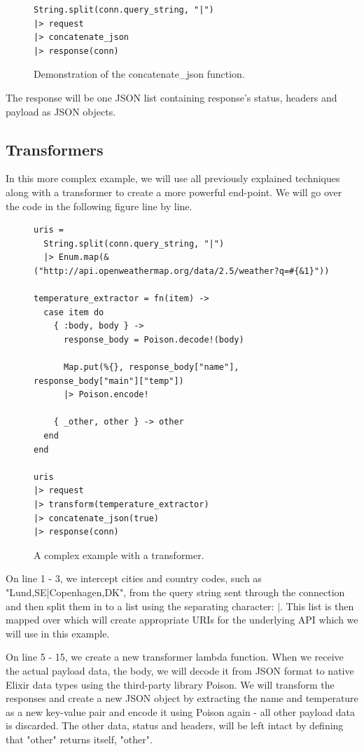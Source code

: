 \documentclass{cslthse-msc}
\begin{document}
\begin{figure}[H]
  \centering
\begin{lstlisting}[breaklines=true,frame=single]
String.split(conn.query_string, "|")
|> request
|> concatenate_json
|> response(conn)
\end{lstlisting}
  \caption{Demonstration of the concatenate\_json function.}
\end{figure}

The response will be one JSON list containing response's status, headers and payload as JSON objects.

\subsection{Transformers}
In this more complex example, we will use all previously explained techniques along with a transformer to create a more powerful end-point. We will go over the code in the following figure line by line.

\begin{figure}[H]
  \centering
\begin{lstlisting}[breaklines=true,frame=single]
uris =
  String.split(conn.query_string, "|")
  |> Enum.map(&("http://api.openweathermap.org/data/2.5/weather?q=#{&1}"))

temperature_extractor = fn(item) ->
  case item do
    { :body, body } ->
      response_body = Poison.decode!(body)

      Map.put(%{}, response_body["name"], response_body["main"]["temp"])
      |> Poison.encode!

    { _other, other } -> other
  end
end

uris
|> request
|> transform(temperature_extractor)
|> concatenate_json(true)
|> response(conn)
\end{lstlisting}
  \caption{A complex example with a transformer.}
\end{figure}

On line 1 - 3, we intercept cities and country codes, such as "Lund,SE|Copenhagen,DK", from the query string sent through the connection and then split them in to a list using the separating character: $|$. This list is then mapped over which will create appropriate URIs for the underlying API which we will use in this example.

On line 5 - 15, we create a new transformer lambda function. When we receive the actual payload data, the body, we will decode it from JSON format to native Elixir data types using the third-party library Poison\cite{poison}. We will transform the responses and create a new JSON object by extracting the name and temperature as a new key-value pair and encode it using Poison again - all other payload data is discarded. The other data, status and headers, will be left intact by defining that "other" returns itself, "other".
\end{document}
